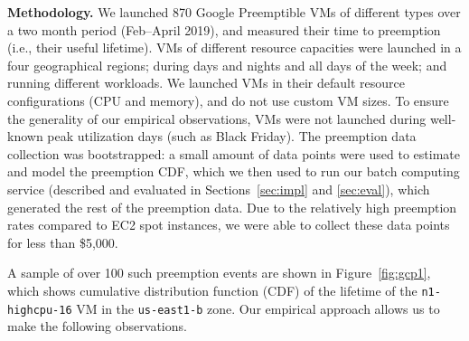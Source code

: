 \documentclass[sigconf]{acmart} %
\begin{document}
\noindent \textbf{Methodology.}
We launched  870 Google Preemptible VMs of different types over a two month period (Feb--April 2019), and measured their time to preemption (i.e., their useful lifetime).
VMs of different resource capacities were launched in a four geographical regions; during days and nights and all days of the week; and running different workloads\footnotemark. 
We launched VMs in their default resource configurations (CPU and memory), and do not use custom VM sizes.
To ensure the generality of our empirical observations, VMs were not launched during well-known peak utilization days (such as Black Friday).
The preemption data collection was bootstrapped: a small amount of data points were used to estimate and model the preemption CDF, which we then used to run our batch computing service (described and evaluated in Sections~\ref{sec:impl} and \ref{sec:eval}), which generated the rest of the preemption data.  
Due to the relatively high preemption rates compared to EC2 spot instances, we were able to collect these data points for less than \$5,000. 


A sample of over 100 such preemption events are shown in Figure~\ref{fig:gcp1}, which shows cumulative distribution function (CDF) of the lifetime of the \texttt{n1-highcpu-16} VM in the \texttt{us-east1-b} zone. 
Our empirical approach allows us to make the following  observations.
\end{document}
